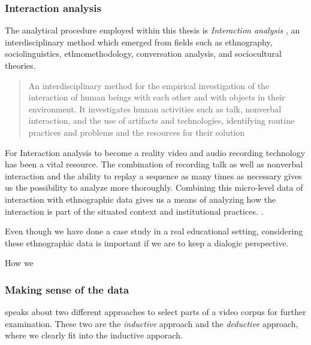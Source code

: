\subsubsection{Interaction analysis}
The analytical procedure employed within this thesis is \emph{Interaction analysis} \citep{jordan1995interaction}, an interdisciplinary method which emerged from fields such as ethnography, sociolinguistics, ethnomethodology, conversation analysis, and sociocultural theories. 

\begin{quote}
An interdisciplinary method for the empirical investigation of the interaction of human
beings with each other and with objects in their environment. It investigates human
activities such as talk, nonverbal interaction, and the use of artifacts and technologies,
identifying routine practices and problems and the resources for their solution \citep[p39]{jordan1995interaction}
\end{quote}

For Interaction analysis to become a reality video and audio recording technology has been a vital resource. The combination of recording talk as well as nonverbal interaction and the ability to replay a sequence as many times as necessary gives us the possibility to analyze more thoroughly. Combining this micro-level data of interaction with ethnographic data gives us a means of analyzing how the interaction is part of the situated context and institutional practices. \citep{furberg2009scientific}. 

Even though we have done a case study in a real educational setting, considering these ethnographic data is important if we are to keep a dialogic perspective. 

How we 


\subsubsection{Making sense of the data}
\citeauthor{derry2010conducting} speaks about two different approaches to select parts of a video corpus for further examination. These two are the \emph{inductive} approach and the \emph{deductive} approach, where we clearly fit into the inductive apporach.

